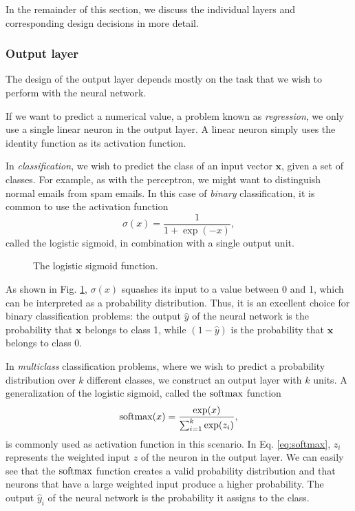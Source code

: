 In the remainder of this section, we discuss the individual layers and corresponding design decisions in more detail.

\subsubsection{Output layer}
The design of the output layer depends mostly on the task that we wish to perform with the neural network. 

If we want to predict a numerical value, a problem known as \emph{regression}, we only use a single linear neuron in the output layer. A linear neuron simply uses the identity function as its activation function.

In \emph{classification}, we wish to predict the class of an input vector $\bm{x}$, given a set of classes. For example, as with the perceptron, we might want to distinguish normal emails from spam emails. In this case of \emph{binary} classification, it is common to use the activation function
\begin{equation}
\sigma(x) = \frac1{1+\exp(-x)},
\end{equation}
called the logistic sigmoid, in combination with a single output unit.
\begin{figure}
	\begin{center}
		
	\end{center}
	\caption{The logistic sigmoid function.}
	\label{fig:sigmoid}
\end{figure}
As shown in Fig. \ref{fig:sigmoid}, $\sigma(x)$ squashes its input to a value between 0 and 1, which can be interpreted as a probability distribution. Thus, it is an excellent choice for binary classification problems: the output $\hat{y}$ of the neural network is the probability that $\bm{x}$ belongs to class 1, while $(1-\hat{y})$ is the probability that $\bm{x}$ belongs to class 0.

In \emph{multiclass} classification problems, where we wish to predict a probability distribution over $k$ different classes, we construct an output layer with $k$ units. A generalization of the logistic sigmoid, called the $\operatorname{softmax}$ function
\begin{equation}\label{eq:softmax}
\operatorname{softmax}(x) = \frac{\exp(x)}{\sum_{i=1}^{k}\exp(z_i)},
\end{equation}
is commonly used as activation function in this scenario. In Eq. \eqref{eq:softmax}, $z_i$ represents the weighted input $z$ of the  neuron in the output layer. We can easily see that the $\operatorname{softmax}$ function creates a valid probability distribution and that neurons that have a large weighted input produce a higher probability. The output $\hat{y}_i$ of the neural network is the probability it assigns to the  class.

